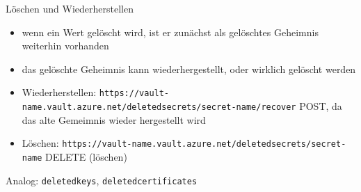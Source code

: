 \begin{flashcard}[Definition]{Löschen und Wiederherstellen}
    \begin{itemize}
        \item wenn ein Wert gelöscht wird, ist er zunächst als gelöschtes Geheimnis weiterhin vorhanden
        \item das gelöschte Geheimnis kann wiederhergestellt, oder wirklich gelöscht werden
        \item Wiederherstellen:\newline
            \texttt{https://vault-name.vault.azure.net/deletedsecrets/secret-name/recover}\newline
            POST, da das alte Gemeimnis wieder hergestellt wird
        \item Löschen:\newline
            \texttt{https://vault-name.vault.azure.net/deletedsecrets/secret-name}\newline
            DELETE (löschen)
    \end{itemize}
    Analog: \texttt{deletedkeys}, \texttt{deletedcertificates}
\end{flashcard}

